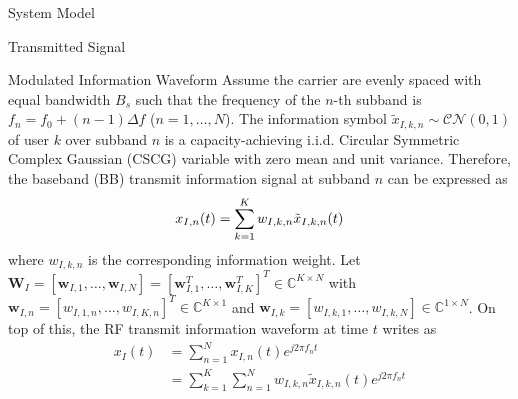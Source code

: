 \documentclass{IEEEtran}
\begin{document}
\begin{section}{System Model}
	\begin{subsection}{Transmitted Signal}
		\begin{subsubsection} {Modulated Information Waveform}
			Assume the carrier are evenly spaced with equal bandwidth $B_s$ such that the frequency of the $n$-th subband is $f_n=f_0+(n-1){\Delta}{f}$ ($n=1,\dots,N$). The information symbol $\tilde{x}_{I,k,n}\sim\mathcal{CN}(0,1)$ of user $k$ over subband $n$ is a capacity-achieving i.i.d. Circular Symmetric Complex Gaussian (CSCG) variable with zero mean and unit variance. Therefore, the baseband (BB) transmit information signal at subband $n$ can be expressed as
			\begin{equation}\label{eq:x_{I,n}(t)}
				x_{I,n}(t)=\sum_{k=1}^K{w_{I,k,n}\tilde{x}_{I,k,n}(t)}
			\end{equation}
			where $w_{I,k,n}$ is the corresponding information weight. Let $\boldsymbol{W}_I=[\boldsymbol{w}_{I,1},\dots,\boldsymbol{w}_{I,N}]=[\boldsymbol{w}_{I,1}^T,\dots,\boldsymbol{w}_{I,K}^T]^T \in \mathbb{C}^{K \times N}$ with $\boldsymbol{w}_{I,n}=[w_{I,1,n},\dots,w_{I,K,n}]^T \in \mathbb{C}^{K \times 1}$ and $\boldsymbol{w}_{I,k}=[w_{I,k,1},\dots,w_{I,k,N}] \in \mathbb{C}^{1 \times N}$. On top of this, the RF transmit information waveform at time $t$ writes as
			\begin{equation}\label{eq:x_I(t)}
				\begin{split}
					x_I(t)
					&=\sum_{n=1}^N{x_{I,n}(t){e^{j2{\pi}{f_n}{t}}}}\\
					&=\sum_{k=1}^K\sum_{n=1}^N{w_{I,k,n}\tilde{x}_{I,k,n}(t){e^{j2{\pi}{f_n}{t}}}}
				\end{split}
			\end{equation}
		\end{subsubsection}


\end{subsection}
\end{section}
\end{document}
